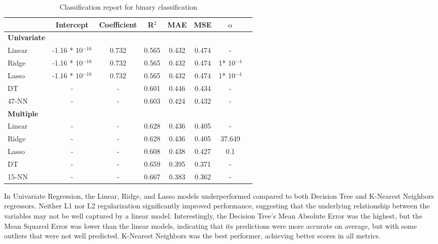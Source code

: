 \begin{table}[H]
    \centering
    \begin{tabular}{lccccccc}
        \toprule
         & \textbf{Intercept} & \textbf{Coefficient} & \textbf{R$^2$} & \textbf{MAE} & \textbf{MSE} & $\alpha$ \\
        \midrule
        \textbf{Univariate} \\
        \midrule
        Linear & -1.16 * 10$^{-16}$ & 0.732 & 0.565 & 0.432 & 0.474 & - \\ %
        Ridge & -1.16 * 10$^{-16}$ & 0.732 & 0.565 & 0.432 & 0.474 & 1* 10$^{-4}$ \\ %
        Lasso & -1.16 * 10$^{-16}$ & 0.732 & 0.565 & 0.432 & 0.474 & 1* 10$^{-4}$ \\ %
        DT & - & - & 0.601 & 0.446 & 0.434 & - \\
        47-NN & - & - & 0.603 & 0.424 & 0.432 & - \\
        \midrule
        \textbf{Multiple}\\
        \midrule
        Linear & - & - & 0.628 & 0.436 & 0.405 & - \\
        Ridge & - & - & 0.628 & 0.436 & 0.405 & 37.649 \\ %
        Lasso & - & - & 0.608 & 0.438 & 0.427 & 0.1 \\ %
        DT & - & - & 0.659 & 0.395 & 0.371 & - \\
        15-NN & - & - & 0.667 & 0.383 & 0.362 & - \\
        \bottomrule
    \end{tabular}
    \caption{Classification report for binary classification}
    \label{tab:uni_multi_regression_report}
\end{table}
In Univariate Regression, the Linear, Ridge, and Lasso models underperformed compared to both Decision
Tree and K-Nearest Neighbors regressors. Neither L1 nor L2 regularization significantly improved
performance, suggesting that the underlying relationship between the variables may not be well
captured by a linear model. 
Interestingly, the Decision Tree's Mean Absolute Error was the highest, but the Mean Squared Error was
lower than the linear models, indicating that its predictions were more accurate
on average, but with some outliers that were not well predicted.
K-Nearest Neighbors was the best performer, achieving better scores in all metrics.

